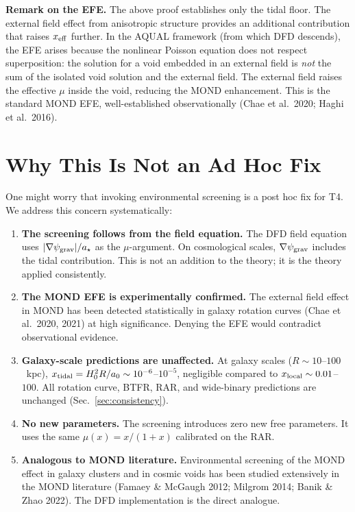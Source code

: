 \documentclass[11pt,a4paper]{article}
\newcommand{\aM}{a_0}
\newcommand{\astar}{a_\star}
\newcommand{\mufd}{\mu}
\newcommand{\psigrav}{\psi_{\rm grav}}
\begin{document}
\textbf{Remark on the EFE.} The above proof establishes only the
tidal floor. The external field effect from anisotropic structure
provides an additional contribution that raises $x_{\rm eff}$ further.
In the AQUAL framework (from which DFD descends), the EFE arises
because the nonlinear Poisson equation does not respect superposition:
the solution for a void embedded in an external field is \emph{not}
the sum of the isolated void solution and the external field. The
external field raises the effective $\mufd$ inside the void, reducing
the MOND enhancement. This is the standard MOND EFE, well-established
observationally (Chae et al.\ 2020; Haghi et al.\ 2016).


\section{Why This Is Not an Ad Hoc Fix}
\label{sec:not-adhoc}

One might worry that invoking environmental screening is a post hoc
fix for T4. We address this concern systematically:

\begin{enumerate}
\item \textbf{The screening follows from the field equation.} The DFD
  field equation uses $|\nabla\psigrav|/\astar$ as the $\mufd$-argument.
  On cosmological scales, $\nabla\psigrav$ includes the tidal
  contribution. This is not an addition to the theory; it is the
  theory applied consistently.

\item \textbf{The MOND EFE is experimentally confirmed.} The external
  field effect in MOND has been detected statistically in galaxy
  rotation curves (Chae et al.\ 2020, 2021) at high significance.
  Denying the EFE would contradict observational evidence.

\item \textbf{Galaxy-scale predictions are unaffected.} At galaxy
  scales ($R \sim 10$--$100$~kpc), $x_{\rm tidal} = H_0^2 R/\aM
  \sim 10^{-6}$--$10^{-5}$, negligible compared to $x_{\rm local}
  \sim 0.01$--$100$. All rotation curve, BTFR, RAR, and wide-binary
  predictions are unchanged (Sec.~\ref{sec:consistency}).

\item \textbf{No new parameters.} The screening introduces zero new
  free parameters. It uses the same $\mufd(x) = x/(1+x)$ calibrated
  on the RAR.

\item \textbf{Analogous to MOND literature.} Environmental screening
  of the MOND effect in galaxy clusters and in cosmic voids has been
  studied extensively in the MOND literature (Famaey \& McGaugh 2012;
  Milgrom 2014; Banik \& Zhao 2022). The DFD implementation is
  the direct analogue.
\end{enumerate}
\end{document}
